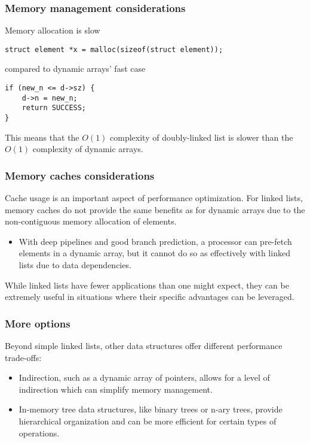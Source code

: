 \documentclass[12pt]{article}
\begin{document}
\subsubsection{Memory management considerations}

Memory allocation is slow

\begin{lstlisting}
struct element *x = malloc(sizeof(struct element));
\end{lstlisting}

compared to dynamic arrays' fast case

\begin{lstlisting}
if (new_n <= d->sz) {
    d->n = new_n;
    return SUCCESS;
}
\end{lstlisting}

This means that the $O(1)$ complexity of doubly-linked list is slower than the $O(1)$ complexity of dynamic arrays.
\subsubsection{Memory caches considerations}
Cache usage is an important aspect of performance optimization. For linked lists, memory caches do not provide the same benefits as for dynamic arrays due to the non-contiguous memory allocation of elements.

\begin{itemize}
    \item With deep pipelines and good branch prediction, a processor can pre-fetch elements in a dynamic array, but it cannot do so as effectively with linked lists due to data dependencies.
\end{itemize}
While linked lists have fewer applications than one might expect, they can be extremely useful in situations where their specific advantages can be leveraged.


\subsubsection{More options}
Beyond simple linked lists, other data structures offer different performance trade-offs:

\begin{itemize}
    \item Indirection, such as a dynamic array of pointers, allows for a level of indirection which can simplify memory management.
    \item In-memory tree data structures, like binary trees or n-ary trees, provide hierarchical organization and can be more efficient for certain types of operations.
\end{itemize}
\end{document}

